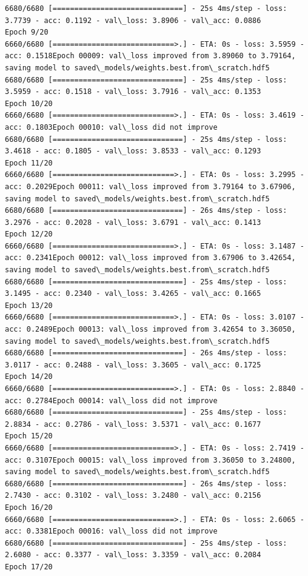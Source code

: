 \documentclass[11pt]{article}
\begin{document}
\begin{Verbatim}[commandchars=\\\{\}]
6680/6680 [==============================] - 25s 4ms/step - loss: 3.7739 - acc: 0.1192 - val\_loss: 3.8906 - val\_acc: 0.0886
Epoch 9/20
6660/6680 [============================>.] - ETA: 0s - loss: 3.5959 - acc: 0.1518Epoch 00009: val\_loss improved from 3.89060 to 3.79164, saving model to saved\_models/weights.best.from\_scratch.hdf5
6680/6680 [==============================] - 25s 4ms/step - loss: 3.5959 - acc: 0.1518 - val\_loss: 3.7916 - val\_acc: 0.1353
Epoch 10/20
6660/6680 [============================>.] - ETA: 0s - loss: 3.4619 - acc: 0.1803Epoch 00010: val\_loss did not improve
6680/6680 [==============================] - 25s 4ms/step - loss: 3.4618 - acc: 0.1805 - val\_loss: 3.8533 - val\_acc: 0.1293
Epoch 11/20
6660/6680 [============================>.] - ETA: 0s - loss: 3.2995 - acc: 0.2029Epoch 00011: val\_loss improved from 3.79164 to 3.67906, saving model to saved\_models/weights.best.from\_scratch.hdf5
6680/6680 [==============================] - 26s 4ms/step - loss: 3.2976 - acc: 0.2028 - val\_loss: 3.6791 - val\_acc: 0.1413
Epoch 12/20
6660/6680 [============================>.] - ETA: 0s - loss: 3.1487 - acc: 0.2341Epoch 00012: val\_loss improved from 3.67906 to 3.42654, saving model to saved\_models/weights.best.from\_scratch.hdf5
6680/6680 [==============================] - 25s 4ms/step - loss: 3.1495 - acc: 0.2340 - val\_loss: 3.4265 - val\_acc: 0.1665
Epoch 13/20
6660/6680 [============================>.] - ETA: 0s - loss: 3.0107 - acc: 0.2489Epoch 00013: val\_loss improved from 3.42654 to 3.36050, saving model to saved\_models/weights.best.from\_scratch.hdf5
6680/6680 [==============================] - 26s 4ms/step - loss: 3.0117 - acc: 0.2488 - val\_loss: 3.3605 - val\_acc: 0.1725
Epoch 14/20
6660/6680 [============================>.] - ETA: 0s - loss: 2.8840 - acc: 0.2784Epoch 00014: val\_loss did not improve
6680/6680 [==============================] - 25s 4ms/step - loss: 2.8834 - acc: 0.2786 - val\_loss: 3.5371 - val\_acc: 0.1677
Epoch 15/20
6660/6680 [============================>.] - ETA: 0s - loss: 2.7419 - acc: 0.3107Epoch 00015: val\_loss improved from 3.36050 to 3.24800, saving model to saved\_models/weights.best.from\_scratch.hdf5
6680/6680 [==============================] - 26s 4ms/step - loss: 2.7430 - acc: 0.3102 - val\_loss: 3.2480 - val\_acc: 0.2156
Epoch 16/20
6660/6680 [============================>.] - ETA: 0s - loss: 2.6065 - acc: 0.3381Epoch 00016: val\_loss did not improve
6680/6680 [==============================] - 25s 4ms/step - loss: 2.6080 - acc: 0.3377 - val\_loss: 3.3359 - val\_acc: 0.2084
Epoch 17/20

\end{Verbatim}
\end{document}
